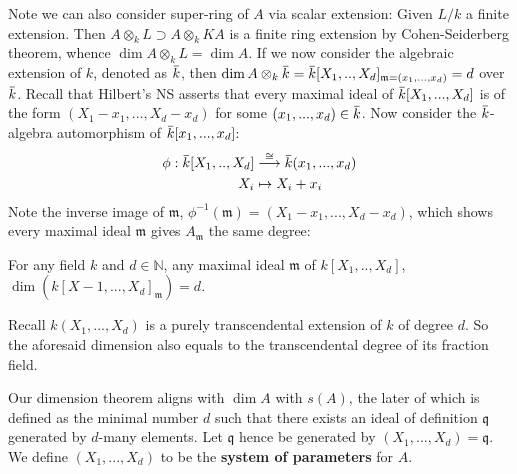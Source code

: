 \documentclass[12pt]{article}
\theoremstyle{definition}
\theoremstyle{plain}
\newcommand{\nat}{\mathbb{N}}
\newcommand{\overbar}[1]{\mkern 1.5mu\overline{\mkern-1.5mu#1\mkern-1.5mu}\mkern 1.5mu}
\renewcommand{\bar}{\overbar}
\begin{document}
\medskip
Note we can also consider super-ring of $A$ via scalar extension: Given $L/k$ a finite extension. Then $A\otimes_k L\supset A\otimes_k K A$ is a finite ring extension by Cohen-Seiderberg theorem, whence $\dim A\otimes_k L=\dim A$. If we now consider the algebraic extension of $k$, denoted as $\bar{k}$, then $\dim A\otimes_k\bar{k}=\bar{k}[X_1, .., X_d]_{\mathfrak{m}=(x_1, ..., x_d)}=d$ over $\bar{k}$. Recall that Hilbert's NS asserts that every maximal ideal of $\bar{k}[X_1, ..., X_d]$ is of the form $(X_1-x_1, ..., X_d-x_d)$ for some $(x_1, ..., x_d)\in \bar{k}$. Now consider the $\bar{k}$-algebra automorphism of $\bar{k}[x_1, ..., x_d]$:
\begin{align*}
  \phi:\bar{k}[X_1, .., X_d]&\overset{\cong}{\longrightarrow} \bar{k}(x_1, ..., x_d)\\
  X_i&\mapsto X_i+x_i
\end{align*}
Note the inverse image of $\mathfrak{m}$, $\phi^{-1}(\mathfrak{m})=(X_1-x_1, ..., X_d-x_d)$, which shows every maximal ideal $\mathfrak{m}$ gives $A_\mathfrak{m}$ the same degree:
\begin{paragraph}
  For any field $k$ and $d\in \nat$, any maximal ideal $\mathfrak{m}$ of $k[X_1, .., X_d]$, $\dim(k[X-1, ..., X_d]_\mathfrak{m})=d$.
\end{paragraph}
\Rmk Recall $k(X_1, ..., X_d)$ is a purely transcendental extension of $k$ of degree $d$. So the aforesaid dimension also equals to the transcendental degree of its fraction field.

\medskip
Our dimension theorem aligns with $\dim A$ with $s(A)$, the later of which is defined as the minimal number $d$ such that there exists an ideal of definition $\mathfrak{q}$ generated by $d$-many elements. Let $\mathfrak{q}$ hence be generated by $(X_1, ..., X_d)=\mathfrak{q}$. We define $(X_1, ..., X_d)$ to be the \textbf{system of parameters} for $A$.
\end{document}
